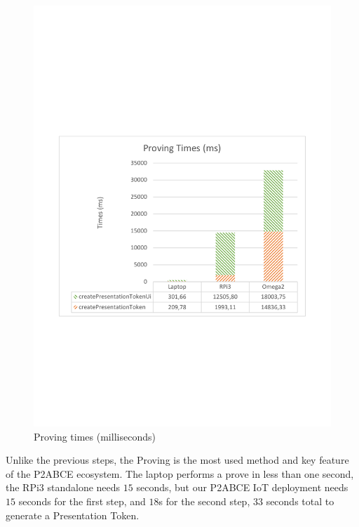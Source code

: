 \begin{figure}[bth]
	\begin{center}
		\includegraphics[width=0.8\linewidth]{gfx/graphics/ProvingGraphTable}
	\end{center}
	\caption{Proving times (milliseconds)}%
	\label{fig:proving:graph}
\end{figure}


Unlike the previous steps, the Proving is the most used method and key feature of the P2ABCE ecosystem. The laptop performs a prove in less than one second, the RPi3 standalone needs $15$ seconds, but our P2ABCE IoT deployment needs $15$ seconds for the first step, and $18$s for the second step, $33$ seconds total to generate a Presentation Token.




\hfil


